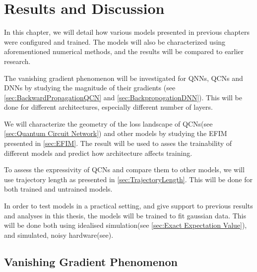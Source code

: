 \chapter{Results and Discussion}\label{chap:results_discussion}
In this chapter, we will detail how various models presented in previous chapters were configured and trained. The models will also be characterized using aforementioned numerical methods, and the results will be compared to earlier research.

The vanishing gradient phenomenon will be investigated for QNNs, QCNs and DNNs by studying the magnitude of their gradients (see \autoref{sec:BackwardPropagationQCN} and \autoref{sec:BackpropogationDNN}). This will be done for different architectures, especially different number of layers.

We will characterize the geometry of the loss landscape of QCNs(see \autoref{sec:Quantum Circuit Network}) and other models by studying the EFIM presented in \autoref{sec:EFIM}. The result will be used to asses the trainability of different models and predict how architecture affects training.

To assess the expressivity of QCNs and compare them to other models, we will use trajectory length as presented in \autoref{sec:TrajectoryLength}. This will be done for both trained and untrained models.

In order to test models in a practical setting, and give support to previous results and analyses in this thesis, the models will be trained to fit gaussian data. This will be done both using idealised simulation(see \autoref{sec:Exact Expectation Value}), and simulated, noisy hardware(see).


\section{Vanishing Gradient Phenomenon}\label{sec:Vanishing Gradient Phenomenon}

